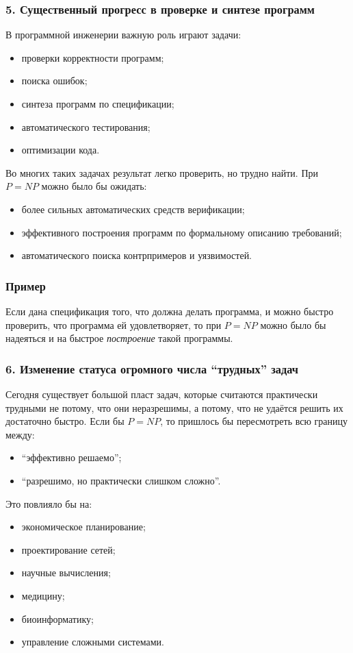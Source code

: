 \documentclass[12pt,a4paper]{article}
\theoremstyle{definition}
\theoremstyle{plain}
\begin{document}
\subsubsection{5. Существенный прогресс в проверке и синтезе программ}
В программной инженерии важную роль играют задачи:
\begin{itemize}
\item проверки корректности программ;
\item поиска ошибок;
\item синтеза программ по спецификации;
\item автоматического тестирования;
\item оптимизации кода.
\end{itemize}

Во многих таких задачах результат легко проверить, но трудно найти. При $P=NP$ можно было бы ожидать:
\begin{itemize}
\item более сильных автоматических средств верификации;
\item эффективного построения программ по формальному описанию требований;
\item автоматического поиска контрпримеров и уязвимостей.
\end{itemize}

\subsubsection*{Пример}
Если дана спецификация того, что должна делать программа, и можно быстро проверить, что программа ей удовлетворяет, то при $P=NP$ можно было бы надеяться и на быстрое \textit{построение} такой программы.

\subsubsection{6. Изменение статуса огромного числа ``трудных'' задач}
Сегодня существует большой пласт задач, которые считаются практически трудными не потому, что они неразрешимы, а потому, что не удаётся решить их достаточно быстро. Если бы $P=NP$, то пришлось бы пересмотреть всю границу между:
\begin{itemize}
\item ``эффективно решаемо'';
\item ``разрешимо, но практически слишком сложно''.
\end{itemize}

Это повлияло бы на:
\begin{itemize}
\item экономическое планирование;
\item проектирование сетей;
\item научные вычисления;
\item медицину;
\item биоинформатику;
\item управление сложными системами.
\end{itemize}
\end{document}
